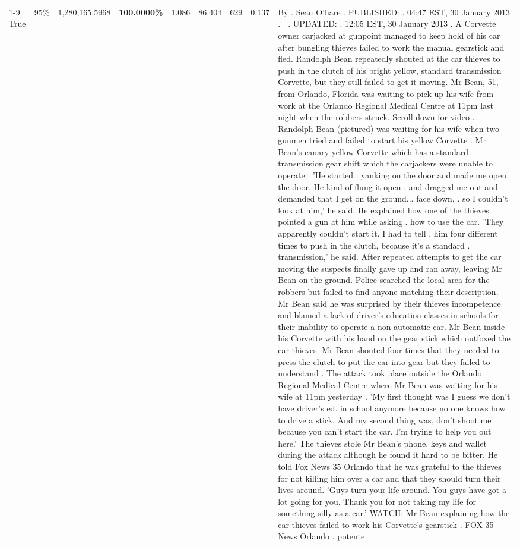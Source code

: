 \begin{table}[H]
\begin{tabular}{lllrlllll}
\cline{1-9} \cline{2-9}
True & 95\% & 1,280,165.5968 & \bfseries \color{red} 100.0000\% & 1.086 & 86.404 & 629 & 0.137 & By . Sean O'hare . PUBLISHED: . 04:47 EST, 30 January 2013 . | . UPDATED: . 12:05 EST, 30 January 2013 . A Corvette owner carjacked at gunpoint managed to keep hold of his car after bungling thieves failed to work the manual gearstick and fled. Randolph Bean repeatedly shouted at the car thieves to push in the clutch of his bright yellow, standard transmission Corvette, but they still failed to get it moving. Mr Bean, 51, from Orlando, Florida was waiting to pick up his wife from work at the Orlando Regional Medical Centre at 11pm last night when the robbers struck. Scroll down for video . Randolph Bean (pictured) was waiting for his wife when two gunmen tried and failed to start his yellow Corvette . Mr Bean's canary yellow Corvette which has a standard transmission gear shift which the carjackers were unable to operate . 'He started . yanking on the door and made me open the door. He kind of flung it open . and dragged me out and demanded that I get on the ground... face down, . so I couldn't look at him,' he said. He explained how one of the thieves pointed a gun at him while asking . how to use the car. 'They apparently couldn't start it. I had to tell . him four different times to push in the clutch, because it's a standard . transmission,' he said. After repeated attempts to get the car moving the suspects finally gave up and ran away, leaving Mr Bean on the ground. Police searched the local area for the robbers but failed to find anyone matching their description. Mr Bean said he was surprised by their thieves incompetence and blamed a lack of driver's education classes in schools for their inability to operate a non-automatic car. Mr Bean inside his Corvette with his hand on the gear stick which outfoxed the car thieves. Mr Bean shouted four times that they needed to press the clutch to put the car into gear but they failed to understand . The attack took place outside the Orlando Regional Medical Centre where Mr Bean was waiting for his wife at 11pm yesterday . 'My first thought was I guess we don't have driver's ed. in school anymore because no one knows how to drive a stick. And my second thing was, don't shoot me because you can't start the car. I'm trying to help you out here.' The thieves stole Mr Bean's phone, keys and wallet during the attack although he found it hard to be bitter. He told Fox News 35 Orlando that he was grateful to the thieves for not killing him over a car and that they should turn their lives around. 'Guys turn your life around. You guys have got a lot going for you. Thank you for not taking my life for something silly as a car.' WATCH: Mr Bean explaining how the car thieves failed to work his Corvette's gearstick . FOX 35 News Orlando . potente \\

\end{tabular}
\end{table}
